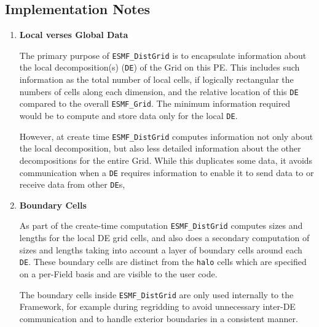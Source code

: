 
\subsection{Implementation Notes}
\begin{enumerate}

\item {\bf Local verses Global Data}

The primary purpose of {\tt ESMF\_DistGrid} is to encapsulate information
about the local decomposition(s) ({\tt DE}) of the Grid on this PE.  
This includes such information as the total 
number of local cells, if logically rectangular the numbers of cells along 
each dimension, and the relative location of this {\tt DE} compared to the
overall {\tt ESMF\_Grid}.  The minimum information required would be
to compute and store data only for the local {\tt DE}.

However, at create time
{\tt ESMF\_DistGrid} computes information not only about the local
decomposition, but also less detailed information
about the other decompositions for the entire Grid.
While this duplicates some data, it avoids communication 
when a {\tt DE} requires information to enable it to send data to 
or receive data from other {\tt DE}s, 

\item {\bf Boundary Cells}

As part of the create-time computation {\tt ESMF\_DistGrid} computes sizes 
and lengths for the local DE grid cells, and also does a secondary computation 
of sizes and lengths taking into account a layer of boundary cells around 
each {\tt DE}.  These boundary cells are distinct from the {\tt halo} cells
which are specified on a per-Field basis and are visible to the user code.

The boundary cells inside {\tt ESMF\_DistGrid} are only used internally
to the Framework, for example during regridding to avoid unnecessary
inter-DE communication and to handle exterior boundaries in a consistent 
manner.

\end{enumerate}












